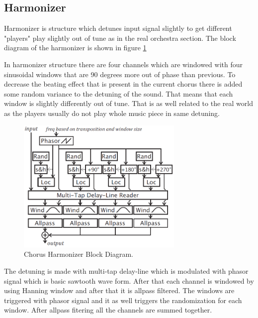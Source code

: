 \subsection{Harmonizer}

Harmonizer is structure which detunes input signal slightly to get different "players" play
slightly out of tune as in the real orchestra section. The block diagram of the harmonizer
is shown in figure \ref{fig_harm}

In harmonizer structure there are four channels which are windowed with four sinusoidal windows
that are 90 degrees more out of phase than previous. To decrease the beating effect that is present
in the current chorus there is added some random variance to the detuning of the sound. That means
that each window is slightly differently out of tune. That is as well related to the real world as the players
usually do not play whole music piece in same detuning. \cite{dudas}
\begin{figure}[ht]
\centering
\includegraphics[width = 8cm]{harmonizer.png}
\caption{Chorus Harmonizer Block Diagram. \cite{dudas}}
\label{fig_harm}
\end{figure}

The detuning is made with multi-tap delay-line which is modulated with phasor signal which is basic sawtooth
wave form. After that each channel is windowed by using Hanning window and after that it is allpass filtered.
The windows are triggered with phasor signal and it as well triggers the randomization for each window.
After allpass fitering all the channels are summed together. \cite{dudas}
